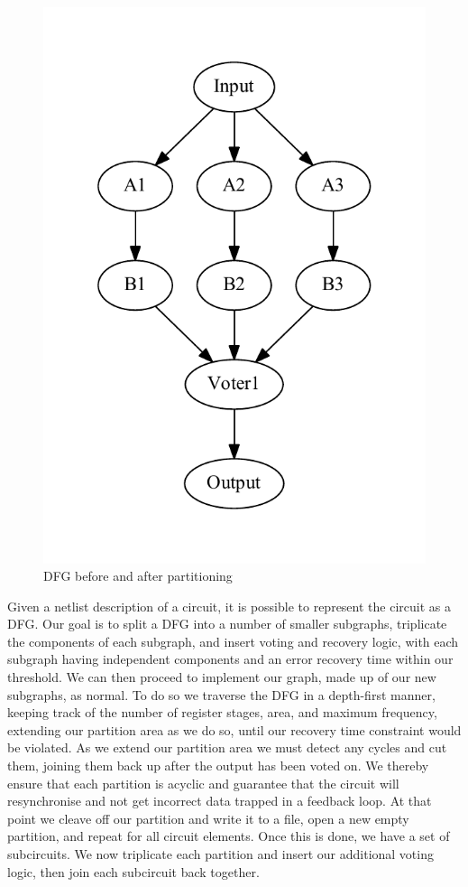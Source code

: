 \documentclass[12pt,final,oneside]{dwThesis} %
\begin{document}
\begin{figure}
\begin{center}
         \includegraphics[height=0.2\textheight]{images/TMR-post.pdf}
         \caption{\gls{DFG} before and after partitioning}
         \label{TMRFigure}
      \end{center}
   \end{figure}
   Given a netlist description of a circuit, it is possible to represent the circuit as a \gls{DFG}\cite{FPGAArch}. Our goal is to split a \gls{DFG} into a number of smaller subgraphs, triplicate the components of each subgraph, and insert voting and recovery logic, with each subgraph having independent components and an error recovery time within our threshold. We can then proceed to implement our graph, made up of our new subgraphs, as normal.
   To do so we traverse the \gls{DFG} in a depth-first manner, keeping track of the number of register stages, area, and maximum frequency, extending our partition area as we do so, until our recovery time constraint would be violated.
   As we extend our partition area we must detect any cycles and cut them, joining them back up after the output has been voted on. We thereby ensure that each partition is acyclic and guarantee that the circuit will resynchronise and not get incorrect data trapped in a feedback loop.
   At that point we cleave off our partition and write it to a file, open a new empty partition, and repeat for all circuit elements.
   Once this is done, we have a set of subcircuits. We now triplicate each partition and insert our additional voting logic, then join each subcircuit back together.
\end{document}
